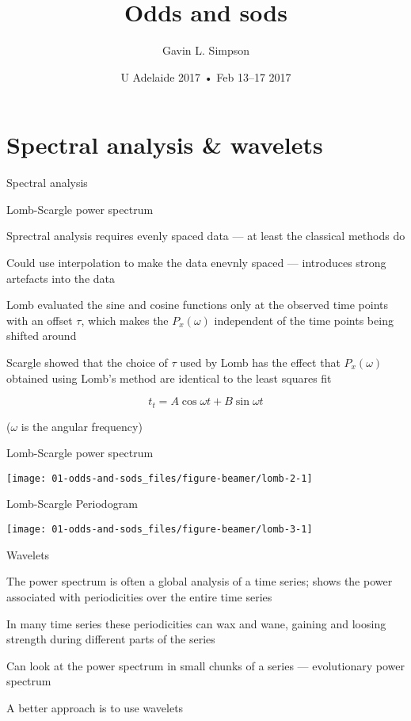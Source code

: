 \documentclass[11pt,ignorenonframetext,compress, aspectratio=169]{beamer}
\title{Odds and sods}
\author{Gavin L. Simpson}
\date{U Adelaide 2017 • Feb 13--17 2017}
\begin{document}
\frame{\titlepage}

\section{Spectral analysis \&
wavelets}\label{spectral-analysis-wavelets}

\begin{frame}{Spectral analysis}

\end{frame}

\begin{frame}{Lomb-Scargle power spectrum}

Sprectral analysis requires evenly spaced data --- at least the
classical methods do

Could use interpolation to make the data enevnly spaced --- introduces
strong artefacts into the data

Lomb evaluated the sine and cosine functions only at the observed time
points with an offset \(\tau\), which makes the \(P_x(\omega)\)
independent of the time points being shifted around

Scargle showed that the choice of \(\tau\) used by Lomb has the effect
that \(P_x(\omega)\) obtained using Lomb's method are identical to the
least squares fit

\[t_t = A \cos \omega t + B \sin \omega t\]

(\(\omega\) is the angular frequency)

\end{frame}

\begin{frame}{Lomb-Scargle power spectrum}

\begin{center}\texttt{[image: 01-odds-and-sods\_files/figure-beamer/lomb-2-1]} \end{center}

\end{frame}

\begin{frame}{Lomb-Scargle Periodogram}

\begin{center}\texttt{[image: 01-odds-and-sods\_files/figure-beamer/lomb-3-1]} \end{center}

\end{frame}

\begin{frame}{Wavelets}

The power spectrum is often a global analysis of a time series; shows
the power associated with periodicities over the entire time series

In many time series these periodicities can wax and wane, gaining and
loosing strength during different parts of the series

Can look at the power spectrum in small chunks of a series ---
\alert{evolutionary power spectrum}

A better approach is to use \alert{wavelets}

\end{frame}
\end{document}
